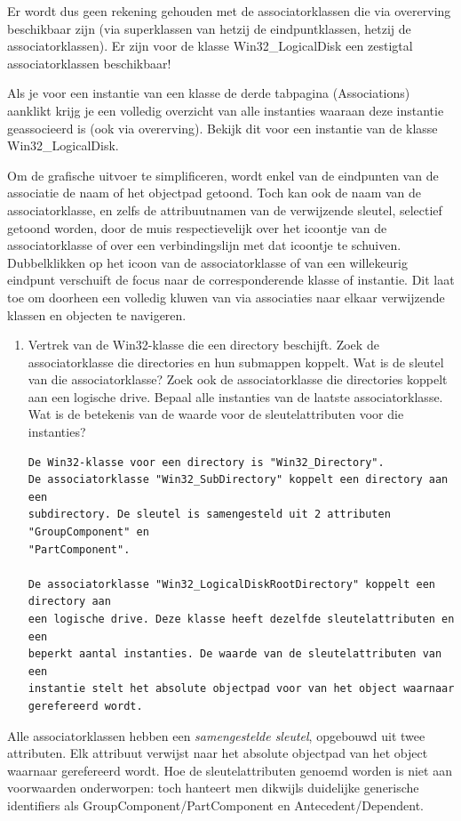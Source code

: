 \documentclass[11pt,a4paper]{report}
\begin{document}
Er wordt dus geen rekening gehouden met de associatorklassen die via overerving beschikbaar zijn (via superklassen van hetzij de eindpuntklassen, hetzij de associatorklassen). Er zijn voor de klasse Win32\_LogicalDisk een zestigtal associatorklassen beschikbaar!
\par Als je voor een instantie van een klasse de derde tabpagina (Associations) aanklikt krijg je een volledig overzicht van alle instanties waaraan deze instantie geassocieerd is (ook via overerving). Bekijk dit voor een instantie van de klasse Win32\_LogicalDisk.
\par Om de grafische uitvoer te simplificeren, wordt enkel van de eindpunten van de associatie de naam of het objectpad getoond. Toch kan ook de naam van de associatorklasse, en zelfs de attribuutnamen van de verwijzende sleutel, selectief getoond worden, door de muis respectievelijk over het icoontje van de associatorklasse of over een verbindingslijn met dat icoontje te schuiven. Dubbelklikken op het icoon van de associatorklasse of van een willekeurig eindpunt verschuift de focus naar de corresponderende klasse of instantie. Dit laat toe om doorheen een volledig kluwen van via associaties naar elkaar verwijzende klassen en objecten te navigeren.
\begin{enumerate}[resume]
	\item Vertrek van de Win32-klasse die een directory beschijft. Zoek de associatorklasse die directories en hun submappen koppelt. Wat is de sleutel van die associatorklasse?
	Zoek ook de associatorklasse die directories koppelt aan een logische drive. Bepaal alle instanties van de laatste associatorklasse. Wat is de betekenis van de waarde voor de sleutelattributen voor die instanties?
	\begin{lstlisting}
De Win32-klasse voor een directory is "Win32_Directory". 
De associatorklasse "Win32_SubDirectory" koppelt een directory aan een 
subdirectory. De sleutel is samengesteld uit 2 attributen "GroupComponent" en
"PartComponent". 

De associatorklasse "Win32_LogicalDiskRootDirectory" koppelt een directory aan 
een logische drive. Deze klasse heeft dezelfde sleutelattributen en een 
beperkt aantal instanties. De waarde van de sleutelattributen van een 
instantie stelt het absolute objectpad voor van het object waarnaar 
gerefereerd wordt.
	\end{lstlisting}
\end{enumerate}
Alle associatorklassen hebben een \textit{samengestelde sleutel}, opgebouwd uit twee attributen. Elk attribuut verwijst naar het absolute objectpad van het object waarnaar gerefereerd wordt. Hoe de sleutelattributen genoemd worden is niet aan voorwaarden onderworpen: toch hanteert men dikwijls duidelijke generische identifiers als GroupComponent/PartComponent en Antecedent/Dependent.
\end{document}
